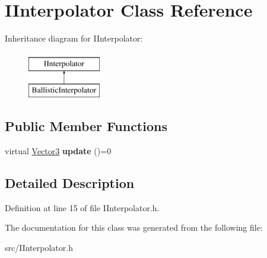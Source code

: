 \hypertarget{classIInterpolator}{\section{I\-Interpolator Class Reference}
\label{classIInterpolator}
}
Inheritance diagram for I\-Interpolator\-:\begin{figure}[H]
\begin{center}
\leavevmode
\includegraphics[height=2.000000cm]{classIInterpolator}
\end{center}
\end{figure}
\subsection*{Public Member Functions}
\begin{DoxyCompactItemize}
\item 
\hypertarget{classIInterpolator_ae808dd40665d235fa0abfadf0aa8d0d1}{virtual \hyperlink{classVectormath_1_1Aos_1_1Vector3}{Vector3} {\bfseries update} ()=0}\label{classIInterpolator_ae808dd40665d235fa0abfadf0aa8d0d1}

\end{DoxyCompactItemize}


\subsection{Detailed Description}


Definition at line 15 of file I\-Interpolator.\-h.



The documentation for this class was generated from the following file\-:\begin{DoxyCompactItemize}
\item 
src/I\-Interpolator.\-h\end{DoxyCompactItemize}
